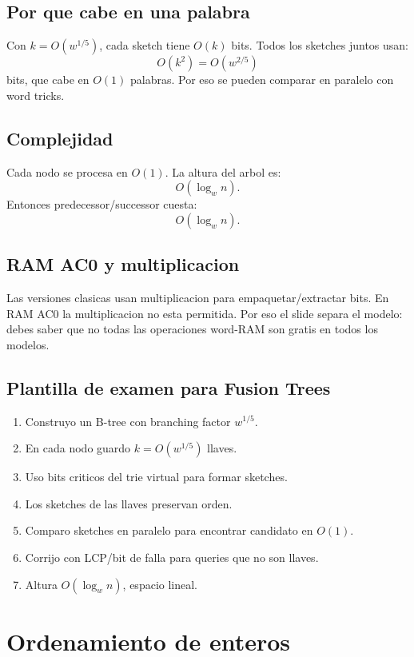 \documentclass[10pt]{article}
\newcommand{\bigO}{O}
\begin{document}
\subsection{Por que cabe en una palabra}
Con $k=\bigO(w^{1/5})$, cada sketch tiene $\bigO(k)$ bits. Todos los sketches
juntos usan:
\[
\bigO(k^2)=\bigO(w^{2/5})
\]
bits, que cabe en $\bigO(1)$ palabras. Por eso se pueden comparar en paralelo
con word tricks.

\subsection{Complejidad}
Cada nodo se procesa en $\bigO(1)$. La altura del arbol es:
\[
\bigO(\log_w n).
\]
Entonces predecessor/successor cuesta:
\[
\bigO(\log_w n).
\]

\subsection{RAM AC0 y multiplicacion}
Las versiones clasicas usan multiplicacion para empaquetar/extractar bits. En
RAM AC0 la multiplicacion no esta permitida. Por eso el slide separa el modelo:
debes saber que no todas las operaciones word-RAM son gratis en todos los
modelos.

\subsection{Plantilla de examen para Fusion Trees}
\begin{enumerate}[leftmargin=*]
\item Construyo un B-tree con branching factor $w^{1/5}$.
\item En cada nodo guardo $k=\bigO(w^{1/5})$ llaves.
\item Uso bits criticos del trie virtual para formar sketches.
\item Los sketches de las llaves preservan orden.
\item Comparo sketches en paralelo para encontrar candidato en $\bigO(1)$.
\item Corrijo con LCP/bit de falla para queries que no son llaves.
\item Altura $\bigO(\log_w n)$, espacio lineal.
\end{enumerate}

\newpage
\section{Ordenamiento de enteros}
\end{document}
